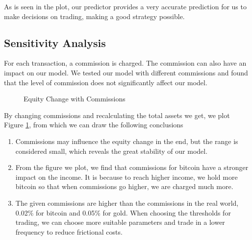 \documentclass[12pt,a4paper]{article}
\begin{document}
\begin{spacing}{1.2}
As is seen in the plot, our predictor provides a very accurate prediction for us to make decisions on trading, making a good strategy possible. 

\subsection{Sensitivity Analysis}

For each transaction, a commission is charged. The commission can also have an impact on our model. We tested our model with different commissions and found that the level of commission does not significantly affect our model.

 \begin{figure}[H]
	\caption{Equity Change with Commissions}
	\label{figure:sensitive_test}
\end{figure}

By changing commissions and recalculating the total assets we get, we plot Figure \ref{figure:sensitive_test}, from which we can draw the following conclusions

\begin{enumerate}
	\item Commissions may influence the equity change in the end, but the range is considered small, which reveals the great stability of our model.
	
	\item From the figure we plot, we find that commissions for bitcoin have a stronger impact on the income. It is because to reach higher income, we hold more bitcoin so that when commissions go higher, we are charged much more.
	
	\item The given commissions are higher than the commissions in the real world, 0.02\% for bitcoin and 0.05\% for gold. When choosing the thresholds for trading, we can choose more suitable parameters and trade in a lower frequency to reduce frictional costs.
\end{enumerate}


\end{spacing}
\end{document}
